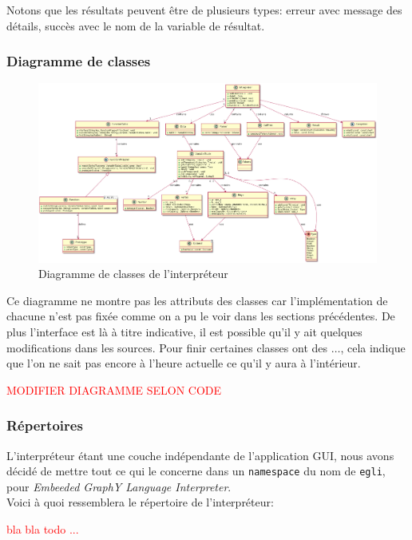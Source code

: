 \documentclass[french]{article}
\begin{document}
				Notons que les résultats peuvent être de plusieurs types: erreur avec message des détails, succès avec le nom de la variable de résultat.
			
			\subsubsection{Diagramme de classes}
			
				\begin{figure}[H]
					\centering
					\includegraphics[width=0.9\textheight,angle=90]{Conception/UMLEGLI}
					\caption{Diagramme de classes de l'interpréteur  \cite{plantuml}}
				\end{figure}
				
				Ce diagramme ne montre pas les attributs des classes car l'implémentation de chacune n'est pas fixée comme on a pu le voir dans les sections précédentes. De plus l'interface est là à titre indicative, il est possible qu'il y ait quelques modifications dans les sources. Pour finir certaines classes ont des $\dots$, cela indique que l'on ne sait pas encore à l'heure actuelle ce qu'il y aura à l'intérieur.
				
				\textcolor{red}{MODIFIER DIAGRAMME SELON CODE}
			
			\subsubsection{Répertoires}
				L'interpréteur étant une couche indépendante de l'application GUI, nous avons décidé de mettre tout ce qui le concerne dans un \texttt{namespace} du nom de \texttt{egli}, pour \textit{Embeeded GraphY Language Interpreter}.\\
				
				Voici à quoi ressemblera le répertoire de l'interpréteur:
				
				\textcolor{red}{bla bla todo ...}
			
\end{document}
